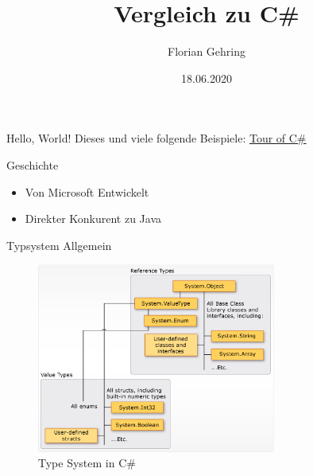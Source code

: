\documentclass[11pt]{beamer}
\author{Florian Gehring}
\title{Vergleich zu C\#}
\date{18.06.2020}
\begin{document}
\begin{frame}
\titlepage
\end{frame}


\begin{frame}{Hello, World!}
%
Dieses und viele folgende Beispiele: \href{https://docs.microsoft.com/de-de/dotnet/csharp/tour-of-csharp/}{Tour of C\#}

\end{frame}


\begin{frame}{Geschichte}
\begin{itemize}
	\item Von Microsoft Entwickelt
	\item \glqq Direkter Konkurent\grqq{} zu Java
\end{itemize}
\end{frame}


\begin{frame}{Typsystem Allgemein}
	\begin{figure}
	\centering
		\includegraphics[width=0.7\textwidth]{bilder/value-reference-types-common-type-system.png}
		\caption{Type System in C\# \cite{progrguide}}
	\end{figure}
\end{frame}
\end{document}
